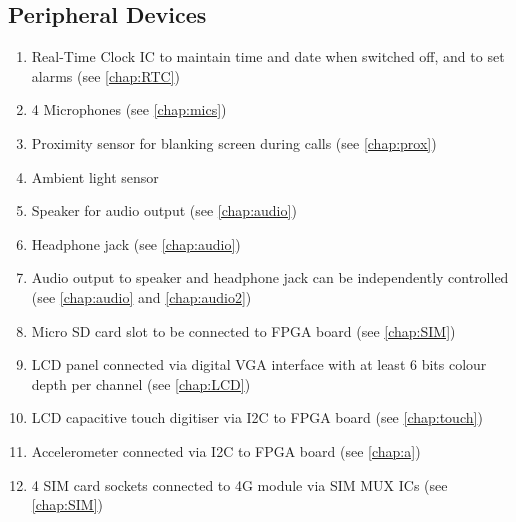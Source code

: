 \subsection{Peripheral Devices}
\begin{enumerate}
\item Real-Time Clock IC to maintain time and date when switched off, and to set alarms (see \autoref{chap:RTC})
\item 4 Microphones (see \autoref{chap:mics})
\item Proximity sensor for blanking screen during calls (see \autoref{chap:prox})
\item Ambient light sensor 
\item Speaker for audio output (see \autoref{chap:audio})
\item Headphone jack (see \autoref{chap:audio})
\item Audio output to speaker and headphone jack can be independently controlled (see \autoref{chap:audio} and \autoref{chap:audio2})
\item Micro SD card slot to be connected to FPGA board (see \autoref{chap:SIM})
\item LCD panel connected via digital VGA interface with at least 6 bits colour depth per channel (see \autoref{chap:LCD})
\item LCD capacitive touch digitiser via I2C to FPGA board (see \autoref{chap:touch})
\item Accelerometer connected via I2C to FPGA board (see \autoref{chap:a})
\item 4 SIM card sockets connected to 4G module via SIM MUX ICs (see \autoref{chap:SIM})
\end{enumerate}




